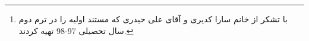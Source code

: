\author
{
    \\
	\footnote{با تشکر از خانم سارا کدیری و آقای علی حیدری که مستند اولیه را در ترم دوم سال تحصیلی 97-98 تهیه کردند. }	
}